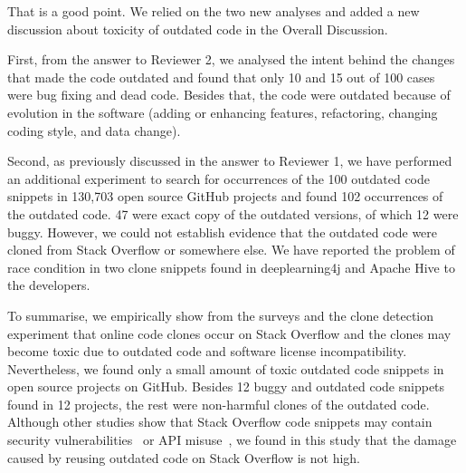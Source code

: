 \documentclass[a4paper,twoside,10pt]{reviewresponse}
\begin{document}

That is a good point. We relied on the two new analyses and added a new discussion about toxicity of outdated code in the Overall Discussion. 

First, from the answer to Reviewer 2, we analysed the intent behind the changes that made the code outdated and found that only 10 and 15 out of 100 cases were bug fixing and dead code. Besides that, the code were outdated because of evolution in the software (adding or enhancing features, refactoring, changing coding style, and data change).

Second, as previously discussed in the answer to Reviewer 1, we have performed an additional experiment to search for occurrences of the 100 outdated code snippets in 130,703 open source GitHub projects and found 102 occurrences of the outdated code. 47 were exact copy of the outdated versions, of which 12 were buggy. However, we could not establish evidence that the outdated code were cloned from Stack Overflow or somewhere else. We have reported the problem of race condition in two clone snippets found in deeplearning4j and Apache Hive to the developers.

To summarise, we empirically show from the surveys and the clone detection experiment that online code clones occur on Stack Overflow and the clones may become toxic due to outdated code and software license incompatibility. 
Nevertheless, we found only a small amount of toxic outdated code snippets in open source projects on GitHub. Besides 12 buggy and outdated code snippets found in 12 projects, the rest were non-harmful clones of the outdated code. Although other studies show that Stack Overflow code snippets may contain security vulnerabilities~\citep{Acar2016,Fischer2017} or API misuse~\citep{Zhang2018}, we found in this study that the damage caused by reusing outdated code on Stack Overflow is not high. 
\end{document}
